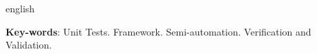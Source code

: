 \begin{resumo}[Abstract]
 \begin{otherlanguage*}{english}
\vspace{\onelineskip}


\noindent
   \textbf{Key-words}: Unit Tests. Framework. Semi-automation. Verification and Validation.
 \end{otherlanguage*}
\end{resumo}
